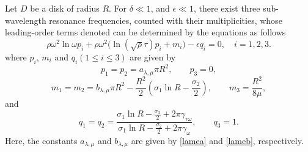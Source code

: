 \documentclass[10pt,a4paper]{amsart}
\begin{document}
\begin{lem}\label{thmdiskomega}
Let $D$ be a disk of radius $R$. For $\delta\ll 1$, and $\epsilon\ll 1$, there exist three sub-wavelength resonance frequencies,
counted with their multiplicities, whose leading-order terms denoted can be determined by the equations as follows
\begin{equation}\label{formuladisk}
{\rho\omega^2\ln\omega p_{i}+\rho\omega^2\Big(\ln{(\sqrt{\rho}\tau)}p_{i}
+m_{i}\Big)-\epsilon q_{i}=0, \quad i=1,2,3.}%
\end{equation}
where $p_{i}$, $m_{i}$ and $q_{i}(1 \leq i \leq 3)$ are given by
\begin{equation}\label{Peigenvalue}
p_{1}=p_{2}={a}_{\lambda,\mu}\pi R^2, \quad\quad  p_{3}=0,\nonumber
\end{equation}
\begin{equation}\label{Meigenvalue}
m_{1}=m_{2}={b}_{\lambda,\mu}\pi R^2-\frac{R^2}{2}\left(\sigma_{1}\ln{R}-\frac{\sigma_2}{2}\right),\quad\quad m_{3}=\frac{R^2}{8\mu},\nonumber
\end{equation}
and
\begin{equation}\label{Qeigenvalue}
q_{1}=q_{2}=\frac{\sigma_{1}\ln{R}-\frac{\sigma_2}{2}+2\pi \gamma_{\tau\omega}}{\sigma_{1}\ln{R}-\frac{\sigma_2}{2}+2\pi \gamma_{\omega}},  \quad\quad  q_{3}=1.\nonumber
\end{equation}
Here, the constants ${a}_{\lambda,\mu}$ and ${b}_{\lambda,\mu}$ are given by \eqref{lamea} and \eqref{lameb}, respectively.
\end{lem}
\end{document}
